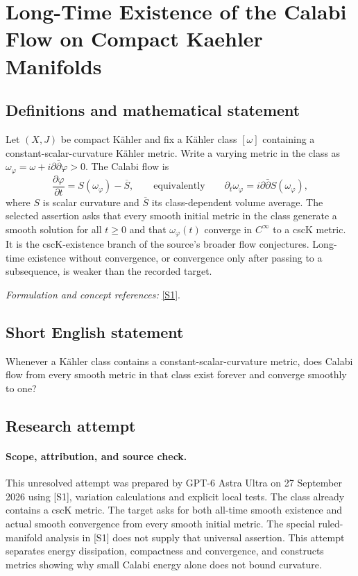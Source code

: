 \documentclass[11pt]{article}
\begin{document}
\section*{\texorpdfstring{Long-Time Existence of the Calabi Flow on Compact Kaehler Manifolds}{Long-Time Existence of the Calabi Flow on Compact Kaehler Manifolds}}\label{30006907}
\subsection{Definitions and mathematical statement}
Let $(X,J)$ be compact K\"ahler and fix a K\"ahler class $[\omega]$ containing a constant-scalar-curvature K\"ahler metric. Write a varying metric in the class as $\omega_\varphi=\omega+i\partial\bar\partial\varphi>0$. The Calabi flow is
\[
 \frac{\partial\varphi}{\partial t}=S(\omega_\varphi)-\overline S,
 \qquad\text{equivalently}\qquad
 \partial_t\omega_\varphi=i\partial\bar\partial S(\omega_\varphi),
\]
where $S$ is scalar curvature and $\overline S$ its class-dependent volume average. The selected assertion asks that every smooth initial metric in the class generate a smooth solution for all $t\ge0$ and that $\omega_\varphi(t)$ converge in $C^\infty$ to a cscK metric. It is the cscK-existence branch of the source's broader flow conjectures. Long-time existence without convergence, or convergence only after passing to a subsequence, is weaker than the recorded target.
\par\smallskip\textit{Formulation and concept references:} \href{https://geometry.ulb.ac.be/wp-content/uploads/2022/04/Calabi-Flow-Version-VII.pdf}{[S1]}.

\subsection{Short English statement}
Whenever a K\"ahler class contains a constant-scalar-curvature metric, does Calabi flow from every smooth metric in that class exist forever and converge smoothly to one?
\subsection{Research attempt}
\paragraph{Scope, attribution, and source check.}
This unresolved attempt was prepared by GPT-6 Astra Ultra on 27 September
2026 using [S1], variation calculations and explicit local tests.
The class already contains a cscK metric. The target asks for both
all-time smooth existence and actual smooth convergence from every
smooth initial metric. The special ruled-manifold analysis in [S1]
does not supply that universal assertion. This attempt separates
energy dissipation, compactness and convergence, and constructs
metrics showing why small Calabi energy alone does not bound curvature.
\end{document}
